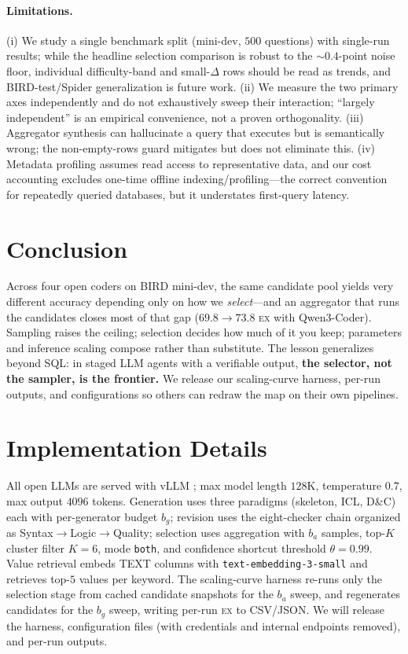 \documentclass{article}
\newcommand{\ex}{\textsc{ex}\xspace}
\begin{document}
\paragraph{Limitations.} (i) We study a single benchmark split (mini-dev, $500$ questions) with single-run results; while the headline selection comparison is robust to the $\sim\!0.4$-point noise floor, individual difficulty-band and small-$\Delta$ rows should be read as trends, and BIRD-test/Spider generalization is future work. (ii) We measure the two primary axes independently and do not exhaustively sweep their interaction; ``largely independent'' is an empirical convenience, not a proven orthogonality. (iii) Aggregator synthesis can hallucinate a query that executes but is semantically wrong; the non-empty-rows guard mitigates but does not eliminate this. (iv) Metadata profiling assumes read access to representative data, and our cost accounting excludes one-time offline indexing/profiling---the correct convention for repeatedly queried databases, but it understates first-query latency.

\section{Conclusion}
\label{sec:conclusion}

Across four open coders on BIRD mini-dev, the same candidate pool yields very different accuracy depending only on how we \emph{select}---and an aggregator that runs the candidates closes most of that gap ($69.8\!\rightarrow\!73.8$ \ex with Qwen3-Coder). Sampling raises the ceiling; selection decides how much of it you keep; parameters and inference scaling compose rather than substitute. The lesson generalizes beyond SQL: in staged LLM agents with a verifiable output, \textbf{the selector, not the sampler, is the frontier.} We release our scaling-curve harness, per-run outputs, and configurations so others can redraw the map on their own pipelines.




\appendix
\section{Implementation Details}
\label{app:impl}
All open LLMs are served with vLLM \citep{kwon2023vllm}; max model length $128$K, temperature $0.7$, max output $4096$ tokens. Generation uses three paradigms (skeleton, ICL, D\&C) each with per-generator budget $b_g$; revision uses the eight-checker chain organized as Syntax$\rightarrow$Logic$\rightarrow$Quality; selection uses aggregation with $b_a$ samples, top-$K$ cluster filter $K{=}6$, mode \texttt{both}, and confidence shortcut threshold $\theta{=}0.99$. Value retrieval embeds TEXT columns with \texttt{text-embedding-3-small} and retrieves top-$5$ values per keyword. The scaling-curve harness re-runs only the selection stage from cached candidate snapshots for the $b_a$ sweep, and regenerates candidates for the $b_g$ sweep, writing per-run \ex{} to CSV/JSON. We will release the harness, configuration files (with credentials and internal endpoints removed), and per-run outputs.
\end{document}
